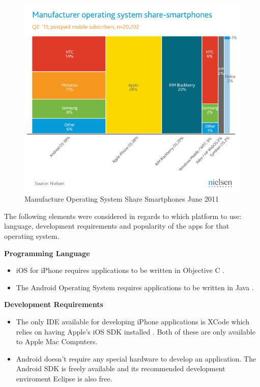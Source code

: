 \begin{figure}[ht]
\begin{center}
\includegraphics[trim = 0mm 20mm 0mm 30mm, clip, scale=0.5]{images/smartphone.png}
\caption{Manufacture Operating System Share Smartphones June 2011 \cite{smartphone}}
\label{fig:Mobile}
\end{center}
\end{figure}

The following elements were considered in regards to which platform to use: language, development requirements and popularity of the apps for that operating system.

\textbf{Programming Language}
\begin{itemize}
	\item{iOS for iPhone requires applications to be written in Objective C \cite{objectivec}.}
	\item{The Android Operating System requires applications to be written in Java \cite{AndroidSDK}.}
\end{itemize}

\textbf{Development Requirements}
\begin{itemize}
	\item{The only IDE available for developing iPhone applications is XCode which relies on having Apple's iOS SDK installed \cite{iOS}. Both of these are only available to Apple Mac Computers.}
	\item{Android doesn't require any special hardware to develop an application. The Android SDK is freely available and its recommended development enviroment Eclipse \cite{Eclipse} is also free.}
\end{itemize}


